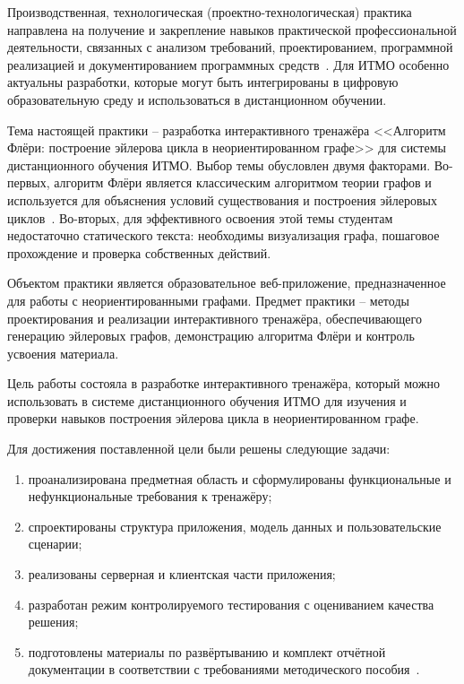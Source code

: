 \documentclass[a4paper,12pt]{extarticle}
\begin{document}
Производственная, технологическая (проектно-технологическая) практика направлена на получение и закрепление навыков практической профессиональной деятельности, связанных с анализом требований, проектированием, программной реализацией и документированием программных средств~\cite{markina2020}. Для ИТМО особенно актуальны разработки, которые могут быть интегрированы в цифровую образовательную среду и использоваться в дистанционном обучении.

Тема настоящей практики -- разработка интерактивного тренажёра <<Алгоритм Флёри: построение эйлерова цикла в неориентированном графе>> для системы дистанционного обучения ИТМО. Выбор темы обусловлен двумя факторами. Во-первых, алгоритм Флёри является классическим алгоритмом теории графов и используется для объяснения условий существования и построения эйлеровых циклов~\cite{wilson2010,west2001}. Во-вторых, для эффективного освоения этой темы студентам недостаточно статического текста: необходимы визуализация графа, пошаговое прохождение и проверка собственных действий.

Объектом практики является образовательное веб-приложение, предназначенное для работы с неориентированными графами. Предмет практики -- методы проектирования и реализации интерактивного тренажёра, обеспечивающего генерацию эйлеровых графов, демонстрацию алгоритма Флёри и контроль усвоения материала.

Цель работы состояла в разработке интерактивного тренажёра, который можно использовать в системе дистанционного обучения ИТМО для изучения и проверки навыков построения эйлерова цикла в неориентированном графе.

Для достижения поставленной цели были решены следующие задачи:
\begin{enumerate}
  \item проанализирована предметная область и сформулированы функциональные и нефункциональные требования к тренажёру;
  \item спроектированы структура приложения, модель данных и пользовательские сценарии;
  \item реализованы серверная и клиентская части приложения;
  \item разработан режим контролируемого тестирования с оцениванием качества решения;
  \item подготовлены материалы по развёртыванию и комплект отчётной документации в соответствии с требованиями методического пособия~\cite{markina2020,gost732}.
\end{enumerate}
\end{document}
